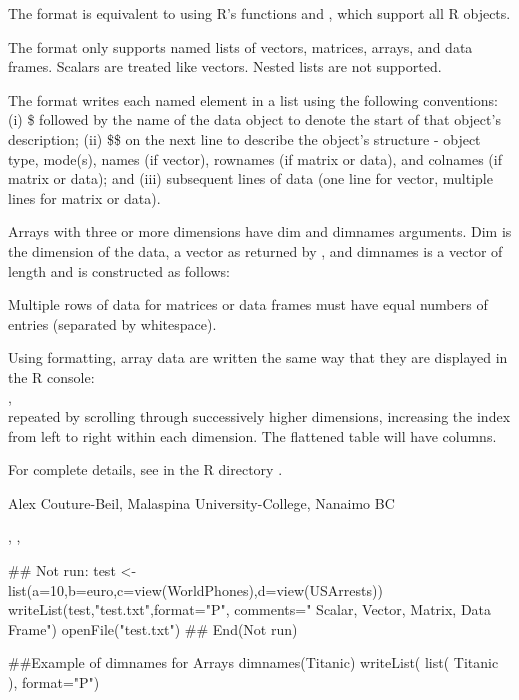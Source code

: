 \documentclass[letterpaper]{book}
\begin{document}
\begin{Details}\relax
The  format is equivalent to using R's  functions 
 and , which support all R objects.

The  format only supports named lists of vectors, matrices, arrays, and data frames. 
Scalars are treated like vectors. Nested lists are not supported. 

The  format writes each named element in a list using the 
following conventions: (i) \$ followed by the name of the data object 
to denote the start of that object's description; (ii) \$\$ on the next line 
to describe the object's structure - object type, mode(s), names (if vector), 
rownames (if matrix or data), and colnames (if matrix or data); and 
(iii) subsequent lines of data (one line for vector, multiple lines for matrix or data).

Arrays with three or more dimensions have dim and dimnames arguments. Dim is the dimension
of the data, a vector as returned by , and dimnames is a vector of length
 and is constructed as follows:


Multiple rows of data for matrices or data frames must have equal 
numbers of entries (separated by whitespace).

Using  formatting, array data are written the same way that 
they are displayed in the R console: \\
,  \\
repeated by scrolling through successively higher dimensions, increasing the 
index from left to right within each dimension. The flattened table will have 
 columns.

For complete details, see  in the 
R directory .
\end{Details}
\begin{Author}\relax
Alex Couture-Beil, Malaspina University-College, Nanaimo BC
\end{Author}
\begin{SeeAlso}\relax
{}, , 
\end{SeeAlso}
\begin{Examples}
\begin{ExampleCode}
## Not run: 
test <- list(a=10,b=euro,c=view(WorldPhones),d=view(USArrests))
writeList(test,"test.txt",format="P",
        comments=" Scalar, Vector, Matrix, Data Frame")
openFile("test.txt")
## End(Not run)

##Example of dimnames for Arrays
dimnames(Titanic)
writeList( list( Titanic ), format="P")
\end{ExampleCode}
\end{Examples}
\end{document}
